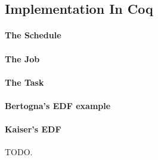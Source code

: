 
\subsection{Implementation In Coq}




\paragraph{The Schedule}

\paragraph{The Job}

\paragraph{The Task}

\paragraph{Bertogna's EDF example}

\paragraph{Kaiser's EDF}
TODO.

